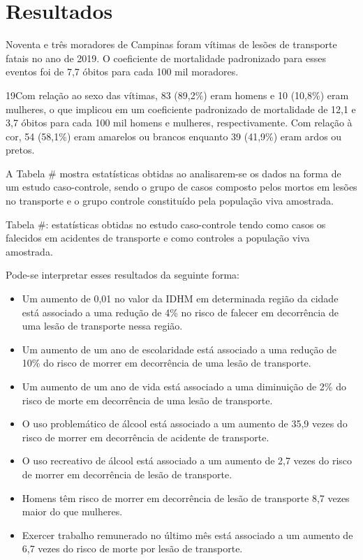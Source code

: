 \section{Resultados}

Noventa e três moradores de Campinas foram vítimas de lesões de transporte fatais no ano de 2019. O coeficiente de mortalidade padronizado para esses eventos foi de 7,7 óbitos para cada 100 mil moradores.

19Com relação ao sexo das vítimas, 83 (89,2\%) eram homens e 10 (10,8\%) eram mulheres, o que implicou em um coeficiente padronizado de mortalidade de 12,1 e 3,7 óbitos para cada 100 mil homens e mulheres, respectivamente. Com relação à cor, 54 (58,1\%) eram amarelos ou brancos enquanto 39 (41,9\%) eram ardos ou pretos.

A Tabela \# mostra estatísticas obtidas ao analisarem-se os dados na forma de um estudo caso-controle, sendo o grupo de casos composto pelos mortos em lesões no transporte e o grupo controle constituído pela população viva amostrada.

Tabela \#: estatísticas obtidas no estudo caso-controle tendo como casos os falecidos em acidentes de transporte e como controles a população viva amostrada.

Pode-se interpretar esses resultados da seguinte forma:
\begin{itemize}
    \item Um aumento de 0,01 no valor da IDHM em determinada região da cidade está associado a uma redução de 4\% no risco de falecer em decorrência de uma lesão de transporte nessa região.
    \item Um aumento de um ano de escolaridade está associado a uma redução de 10\% do risco de morrer em decorrência de uma lesão de transporte.
    \item Um aumento de um ano de vida está associado a uma diminuição de 2\% do risco de morte em decorrência de uma lesão de transporte.
    \item O uso problemático de álcool está associado a um aumento de 35,9 vezes do risco de morrer em decorrência de acidente de transporte.
    \item O uso recreativo de álcool está associado a um aumento de 2,7 vezes do risco de morrer em decorrência de lesão de transporte.
    \item Homens têm risco de morrer em decorrência de lesão de transporte 8,7 vezes maior do que mulheres.
    \item Exercer trabalho remunerado no último mês está associado a um aumento de 6,7 vezes do risco de morte por lesão de transporte.
\end{itemize}

